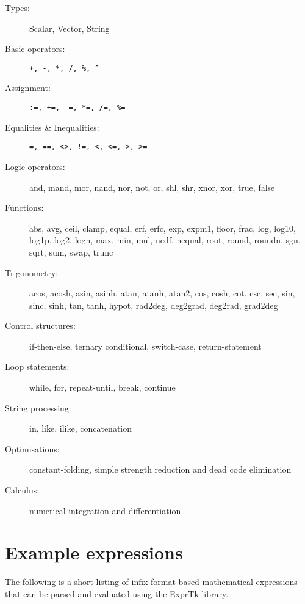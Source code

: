 \begin{description}
 \item[Types:]           Scalar, Vector, String

 \item[Basic operators:] \verb'+, -, *, /, %, ^'

 \item[Assignment:]      \verb':=, +=, -=, *=, /=, %='

 \item[Equalities \& Inequalities:]    \verb'=, ==, <>, !=, <, <=, >, >='

 \item[Logic operators:] and, mand, mor, nand, nor, not, or, shl, shr,
                       xnor, xor, true, false

 \item[Functions:]       abs, avg, ceil, clamp, equal, erf, erfc,  exp,
                       expm1, floor, frac,  log, log10, log1p,  log2,
                       logn,  max,  min,  mul,  ncdf,  nequal,  root,
                       round, roundn, sgn, sqrt, sum, swap, trunc

 \item[Trigonometry:]    acos, acosh, asin, asinh, atan, atanh,  atan2,
                       cos,  cosh, cot,  csc, sec,  sin, sinc,  sinh,
                       tan, tanh, hypot, rad2deg, deg2grad,  deg2rad,
                       grad2deg

 \item[Control structures:]      if-then-else, ternary conditional, switch-case,
                       return-statement

 \item[Loop statements:] while, for, repeat-until, break, continue

 \item[String processing:]      in, like, ilike, concatenation

 \item[Optimisations:]   constant-folding, simple strength reduction and
                       dead code elimination

 \item[Calculus:]        numerical integration and differentiation

\end{description}

\section{Example expressions}
The following is  a short listing  of infix format  based mathematical
expressions that can be parsed and evaluated using the ExprTk library.

